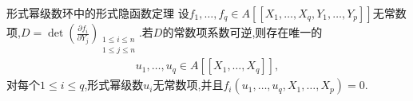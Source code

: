 \begin{corollary}{形式幂级数环中的形式隐函数定理}{}
	设$f_{1},\ldots,f_{q}\in A[[X_{1},\ldots,X_{q},Y_{1},\ldots,Y_{p}]]$无常数项,$D=\det\left(\frac{\partial f_{i}}{\partial Y_{j}}\right)_{\substack{1\leq i\leq n\\1\leq j\leq n}}$.若$D$的常数项系数可逆,则存在唯一的
	\begin{align*}
		u_{1},\ldots,u_{q}\in A[[X_{1},\ldots,X_{q}]],
	\end{align*}
	对每个$1\leq i\leq q$,形式幂级数$u_{i}$无常数项,并且$f_{i}\left(u_{1},\ldots,u_{q},X_{1},\ldots,X_{p}\right)=0$.
\end{corollary}











